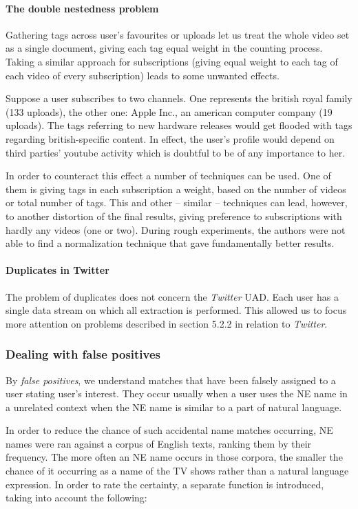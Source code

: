 \paragraph{The double nestedness problem}
Gathering tags across user's favourites or uploads let us treat the whole video
set as a single document, giving each tag equal weight in the counting process.
Taking a similar approach for subscriptions (\eg giving equal weight to each
tag of each video of every subscription) leads to some unwanted effects.

Suppose a user subscribes to two channels. One represents the british royal
family (133 uploads), the other one: Apple Inc., an american computer company
(19 uploads). The tags referring to new hardware releases would get flooded with
tags regarding british-specific content. In effect, the user's profile would
depend on third parties' youtube activity which is doubtful to be of any
importance to her.

In order to counteract this effect a number of techniques can be used. One of
them is giving tags in each subscription a weight, based on the number of videos or
total number of tags. This and other -- similar -- techniques can lead,
however, to another distortion of the final results, giving preference to
subscriptions with hardly any videos (one or two). During rough experiments,
the authors were not able to find a normalization technique that gave
fundamentally better results.

\paragraph{Duplicates in Twitter}
The problem of duplicates does not concern the \textit{Twitter} UAD. Each user has a single
data stream on which all extraction is performed. This allowed us to focus more attention
on problems described in section 5.2.2 in relation to \textit{Twitter}.

\subsubsection{Dealing with false positives}
By \textit{false positives}, we understand matches that have been falsely assigned to a user stating user's interest.
They occur usually when a user uses the NE name in a unrelated context when the NE name is similar to a
part of natural language.

In order to reduce the chance of such accidental name matches occurring, NE names were ran against a corpus
of English texts, ranking them by their frequency. The more often an NE name occurs in those corpora, the smaller the chance of it occurring as a name of the TV shows rather than a natural language expression. In order to rate the certainty, a separate function is introduced, taking into account the following:

